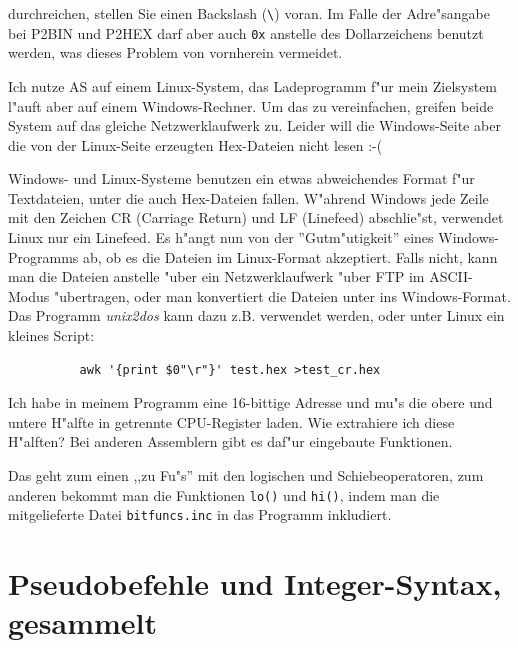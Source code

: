 \documentclass[12pt,a4paper,twoside]{report}
\newcommand{\tty}[1]{{\tt #1}}
\newcommand{\asname}{AS}
\begin{document}
\begin{description}
{          durchreichen, stellen Sie einen Backslash (\verb!\!) voran.
          Im Falle der Adre"sangabe bei P2BIN und P2HEX darf aber auch
          \tty{0x} anstelle des Dollarzeichens benutzt werden, was dieses
          Problem von vornherein vermeidet.}
\vspace{0.3cm}
\item[F:]{Ich nutze \asname{} auf einem Linux-System, das Ladeprogramm f"ur
          mein Zielsystem l"auft aber auf einem Windows-Rechner.  Um das
          zu vereinfachen, greifen beide System auf das gleiche
          Netzwerklaufwerk zu.  Leider will die Windows-Seite aber die
          von der Linux-Seite erzeugten Hex-Dateien nicht lesen :-(}
\item[A:]{Windows- und Linux-Systeme benutzen ein etwas abweichendes
          Format f"ur Textdateien, unter die auch Hex-Dateien fallen.
          W"ahrend Windows jede Zeile mit den Zeichen CR (Carriage Return)
          und LF (Linefeed) abschlie"st, verwendet Linux nur ein Linefeed.
          Es h"angt nun von der ''Gutm"utigkeit'' eines Windows-Programms
          ab, ob es die Dateien im Linux-Format akzeptiert.  Falls nicht,
          kann man die Dateien anstelle "uber ein Netzwerklaufwerk "uber
          FTP im ASCII-Modus "ubertragen, oder man konvertiert die Dateien
          unter ins Windows-Format.  Das Programm {\em unix2dos} kann dazu
          z.B. verwendet werden, oder unter Linux ein kleines Script:
          \begin{verbatim}
          awk '{print $0"\r"}' test.hex >test_cr.hex
          \end{verbatim}}
\vspace{0.3cm}
\item[F:]{Ich habe in meinem Programm eine 16-bittige Adresse und mu"s
          die obere und untere H"alfte in getrennte CPU-Register laden.
          Wie extrahiere ich diese H"alften?  Bei anderen Assemblern
          gibt es daf"ur eingebaute Funktionen.}
\item[A:]{Das geht zum einen ,,zu Fu"s'' mit den logischen und
          Schiebeoperatoren, zum anderen bekommt man die Funktionen
          {\tt lo()} und {\tt hi()}, indem man die mitgelieferte Datei
          {\tt bitfuncs.inc} in das Programm inkludiert.}          
\end{description}


\cleardoublepage
\chapter{Pseudobefehle und Integer-Syntax, gesammelt}
\label{SectPseudoInst}
\end{document}

